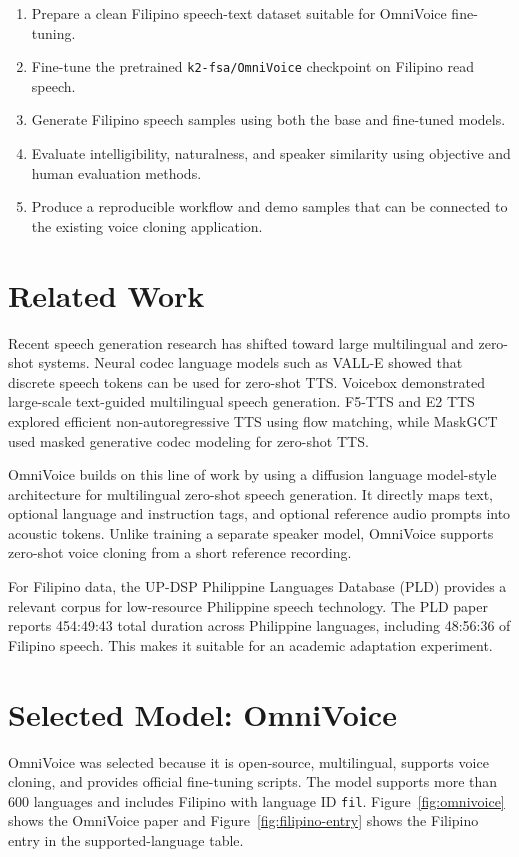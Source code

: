 \documentclass[11pt]{article}
\begin{document}
\begin{enumerate}
  \item Prepare a clean Filipino speech-text dataset suitable for OmniVoice fine-tuning.
  \item Fine-tune the pretrained \texttt{k2-fsa/OmniVoice} checkpoint on Filipino read speech.
  \item Generate Filipino speech samples using both the base and fine-tuned models.
  \item Evaluate intelligibility, naturalness, and speaker similarity using objective and human evaluation methods.
  \item Produce a reproducible workflow and demo samples that can be connected to the existing voice cloning application.
\end{enumerate}

\section{Related Work}

Recent speech generation research has shifted toward large multilingual and zero-shot systems. Neural codec language models such as VALL-E showed that discrete speech tokens can be used for zero-shot TTS. Voicebox demonstrated large-scale text-guided multilingual speech generation. F5-TTS and E2 TTS explored efficient non-autoregressive TTS using flow matching, while MaskGCT used masked generative codec modeling for zero-shot TTS.

OmniVoice builds on this line of work by using a diffusion language model-style architecture for multilingual zero-shot speech generation. It directly maps text, optional language and instruction tags, and optional reference audio prompts into acoustic tokens. Unlike training a separate speaker model, OmniVoice supports zero-shot voice cloning from a short reference recording.

For Filipino data, the UP-DSP Philippine Languages Database (PLD) provides a relevant corpus for low-resource Philippine speech technology. The PLD paper reports 454:49:43 total duration across Philippine languages, including 48:56:36 of Filipino speech. This makes it suitable for an academic adaptation experiment.

\section{Selected Model: OmniVoice}

OmniVoice was selected because it is open-source, multilingual, supports voice cloning, and provides official fine-tuning scripts. The model supports more than 600 languages and includes Filipino with language ID \texttt{fil}. Figure~\ref{fig:omnivoice} shows the OmniVoice paper and Figure~\ref{fig:filipino-entry} shows the Filipino entry in the supported-language table.
\end{document}
